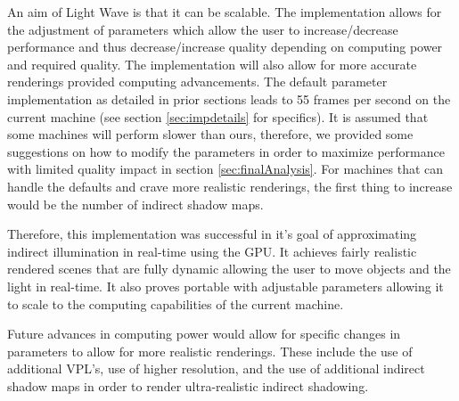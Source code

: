 An aim of Light Wave is that it can be scalable.  The implementation allows for the adjustment of parameters which allow the user to increase/decrease performance and thus decrease/increase quality depending on computing power and required quality.  The implementation will also allow for more accurate renderings provided computing advancements.  The default parameter implementation as detailed in prior sections leads to 55 frames per second on the current machine (see section \ref{sec:impdetails} for specifics).  It is assumed that some machines will perform slower than ours, therefore, we provided some suggestions on how to modify the parameters in order to maximize performance with limited quality impact in section \ref{sec:finalAnalysis}.  For machines that can handle the defaults and crave more realistic renderings, the first thing to increase would be the number of indirect shadow maps.

Therefore, this implementation was successful in it's goal of approximating indirect illumination in real-time using the GPU.  It achieves fairly realistic rendered scenes that are fully dynamic allowing the user to move objects and the light in real-time.  It also proves portable with adjustable parameters allowing it to scale to the computing capabilities of the current machine.

Future advances in computing power would allow for specific changes in parameters to allow for more realistic renderings.  These include the use of additional VPL's, use of higher resolution, and the use of additional indirect shadow maps in order to render ultra-realistic indirect shadowing.
